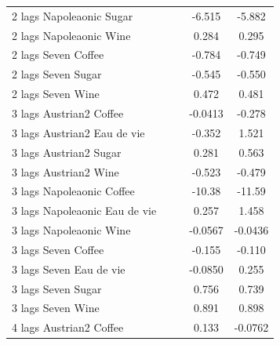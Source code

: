 \documentclass[12pt,a4paper,titlepage]{article}
\begin{document}
{\begin{longtable}{l*{4}{c}}
2 lags Napoleaonic Sugar&                     &                     &      -6.515\sym{***}&      -5.882\sym{***}\\
2 lags Napoleaonic Wine&                     &                     &       0.284         &       0.295         \\
2 lags Seven Coffee &                     &                     &      -0.784\sym{***}&      -0.749\sym{***}\\
2 lags Seven Sugar  &                     &                     &      -0.545\sym{***}&      -0.550\sym{***}\\
2 lags Seven Wine   &                     &                     &       0.472\sym{***}&       0.481\sym{***}\\
3 lags Austrian2 Coffee&                     &                     &     -0.0413         &      -0.278         \\
3 lags Austrian2 Eau de vie&                     &                     &      -0.352         &       1.521         \\
3 lags Austrian2 Sugar&                     &                     &       0.281\sym{*}  &       0.563         \\
3 lags Austrian2 Wine&                     &                     &      -0.523\sym{*}  &      -0.479\sym{*}  \\
3 lags Napoleaonic Coffee&                     &                     &      -10.38\sym{***}&      -11.59\sym{***}\\
3 lags Napoleaonic Eau de vie&                     &                     &       0.257         &       1.458         \\
3 lags Napoleaonic Wine&                     &                     &     -0.0567         &     -0.0436         \\
3 lags Seven Coffee &                     &                     &      -0.155         &      -0.110         \\
3 lags Seven Eau de vie&                     &                     &     -0.0850         &       0.255         \\
3 lags Seven Sugar  &                     &                     &       0.756\sym{***}&       0.739\sym{***}\\
3 lags Seven Wine   &                     &                     &       0.891\sym{***}&       0.898\sym{***}\\
4 lags Austrian2 Coffee&                     &                     &       0.133         &     -0.0762         \\

\end{longtable}}
\end{document}
